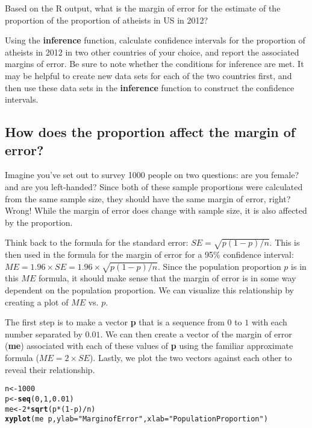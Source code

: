 \documentclass{article}\usepackage[]{graphicx}\usepackage[]{color}
\makeatletter
\newcommand{\hlnum}[1]{\textcolor[rgb]{0.686,0.059,0.569}{#1}}%
\newcommand{\hlstr}[1]{\textcolor[rgb]{0.192,0.494,0.8}{#1}}%
\newcommand{\hlopt}[1]{\textcolor[rgb]{0,0,0}{#1}}%
\newcommand{\hlstd}[1]{\textcolor[rgb]{0.345,0.345,0.345}{#1}}%
\newcommand{\hlkwb}[1]{\textcolor[rgb]{0.69,0.353,0.396}{#1}}%
\newcommand{\hlkwc}[1]{\textcolor[rgb]{0.333,0.667,0.333}{#1}}%
\newcommand{\hlkwd}[1]{\textcolor[rgb]{0.737,0.353,0.396}{\textbf{#1}}}%
\newenvironment{kframe}{%
 \def\at@end@of@kframe{}%
 \ifinner\ifhmode%
  \def\at@end@of@kframe{\end{minipage}}%
  \begin{minipage}{\columnwidth}%
 \fi\fi%
 \def\FrameCommand##1{\hskip\@totalleftmargin \hskip-\fboxsep
 \colorbox{shadecolor}{##1}\hskip-\fboxsep
     \hskip-\linewidth \hskip-\@totalleftmargin \hskip\columnwidth}%
 \MakeFramed {\advance\hsize-\width
   \@totalleftmargin\z@ \linewidth\hsize
   \@setminipage}}%
 {\par\unskip\endMakeFramed%
 \at@end@of@kframe}
\newenvironment{knitrout}{}{} %
\makeatother
\begin{document}
\begin{exercise}
Based on the R output, what is the margin of error for the estimate of the proportion of the proportion of atheists in US in 2012? 
\end{exercise}

\begin{exercise}
Using the \hlkwd{inference} function, calculate confidence intervals for the proportion of atheists in 2012 in two other countries of your choice, and report the associated margins of error. Be sure to note whether the conditions for inference are met. It may be helpful to create new data sets for each of the two countries first, and then use these data sets in the \hlkwd{inference} function to construct the confidence intervals.
\end{exercise}

\subsection*{How does the proportion affect the margin of error?}
Imagine you've set out to survey 1000 people on two questions: are you female? and are you left-handed? Since both of these sample proportions were calculated from the same sample size, they should have the same margin of error, right? Wrong!  While the margin of error does change with sample size, it is also affected by the proportion.

Think back to the formula for the standard error: $SE = \sqrt{p(1-p)/n}$. This is then used in the formula for the margin of error for a 95\% confidence interval: $ME = 1.96\times SE = 1.96\times\sqrt{p(1-p)/n}$. Since the population proportion $p$ is in this $ME$ formula, it should make sense that the margin of error is in some way dependent on the population proportion. We can visualize this relationship by creating a plot of $ME$ vs. $p$.

The first step is to make a vector \hlkwd{p} that is a sequence from $0$ to $1$ with each number separated by $0.01$. We can then create a vector of the margin of error (\hlkwd{me}) associated with each of these values of \hlkwd{p} using the familiar approximate formula ($ME = 2 \times SE$). Lastly, we plot the two vectors against each other to reveal their relationship.

\begin{knitrout}
\color{fgcolor}\begin{kframe}
\begin{alltt}
\hlstd{n} \hlkwb{<-} \hlnum{1000}
\hlstd{p} \hlkwb{<-} \hlkwd{seq}\hlstd{(}\hlnum{0}\hlstd{,} \hlnum{1}\hlstd{,} \hlnum{0.01}\hlstd{)}
\hlstd{me} \hlkwb{<-} \hlnum{2}\hlopt{*}\hlkwd{sqrt}\hlstd{(p}\hlopt{*}\hlstd{(}\hlnum{1} \hlopt{-} \hlstd{p)}\hlopt{/}\hlstd{n)}
\hlkwd{xyplot}\hlstd{(me} \hlopt{~} \hlstd{p,} \hlkwc{ylab}\hlstd{=}\hlstr{"Margin of Error"}\hlstd{,} \hlkwc{xlab}\hlstd{=}\hlstr{"Population Proportion"}\hlstd{)}
\end{alltt}
\end{kframe}
\end{knitrout}
\end{document}
